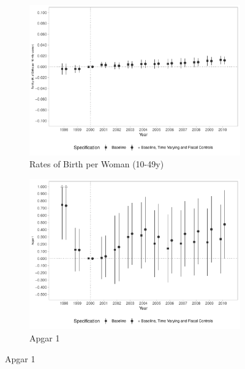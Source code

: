 \begin{figure}[h!]
    \begin{center}
    \caption{Effects on Fertility and Birth Outcomes}\label{fig:18}
    \begin{subfigure}{0.32\textwidth}
        \caption{\scriptsize Rates of Birth per Woman (10-49y)}\label{fig:18a}
        \centering
        \includegraphics[width=\textwidth]{plots/birth_fertility_dist_ec29_baseline_dist_ec29_baseline_18.pdf}
    \end{subfigure}
    \begin{subfigure}{0.32\textwidth}
        \centering
        \caption{\scriptsize Apgar 1}\label{fig:18b}
        \includegraphics[width=\textwidth]{plots/birth_apgar1_dist_ec29_baseline_dist_ec29_baseline_18.pdf}
    \end{subfigure}

\end{center}
\end{figure}
